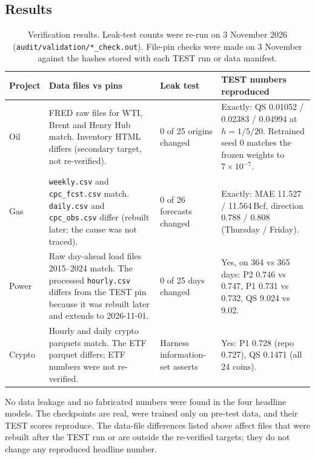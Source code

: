\documentclass[10pt,a4paper]{article}
\newcommand{\src}[1]{{\footnotesize\texttt{#1}}}
\begin{document}
\subsection{Results}
\begin{table}[H]
\centering\small
\caption{Verification results. Leak-test counts were re-run on 3 November 2026 (\src{audit/validation/*\_check.out}). File-pin checks were made on 3 November against the hashes stored with each TEST run or data manifest.}
\label{tab:verify}
\begin{tabularx}{\linewidth}{@{}p{1.6cm}Xp{2.1cm}X@{}}
\toprule
Project & Data files vs pins & Leak test & TEST numbers reproduced\\
\midrule
Oil & FRED raw files for WTI, Brent and Henry Hub match. Inventory HTML differs (secondary target, not re-verified). & 0 of 25 origins changed & Exactly: QS 0.01052 / 0.02383 / 0.04994 at $h=1/5/20$. Retrained seed 0 matches the frozen weights to $7\times10^{-7}$.\\
Gas & \texttt{weekly.csv} and \texttt{cpc\_fcst.csv} match. \texttt{daily.csv} and \texttt{cpc\_obs.csv} differ (rebuilt later; the cause was not traced). & 0 of 26 forecasts changed & Exactly: MAE 11.527 / 11.564\,Bcf, direction 0.788 / 0.808 (Thursday / Friday).\\
Power & Raw day-ahead load files 2015--2024 match. The processed \texttt{hourly.csv} differs from the TEST pin because it was rebuilt later and extends to 2026-11-01. & 0 of 25 days changed & Yes, on 364 vs 365 days: P2 0.746 vs 0.747, P1 0.731 vs 0.732, QS 9.024 vs 9.02.\\
Crypto & Hourly and daily crypto parquets match. The ETF parquet differs; ETF numbers were not re-verified. & Harness information-set asserts & Yes: P1 0.728 (repo 0.727), QS 0.1471 (all 24 coins).\\
\bottomrule
\end{tabularx}
\end{table}

\begin{keybox}[title=Verdict]
No data leakage and no fabricated numbers were found in the four headline models. The checkpoints are real, were trained only on pre-test data, and their TEST scores reproduce. The data-file differences listed above affect files that were rebuilt after the TEST run or are outside the re-verified targets; they do not change any reproduced headline number.
\end{keybox}

\end{document}
